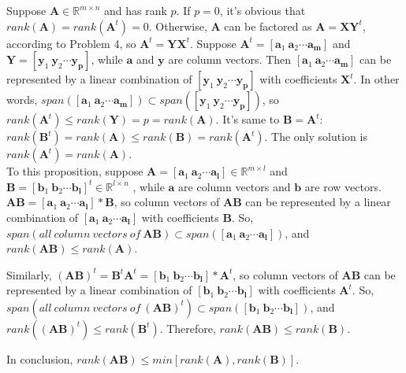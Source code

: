 \documentclass[22pt]{article}
\begin{document}
   		Suppose $\mathbf{A} \in \mathbb{R}^{m\times n}$ and has rank $p$. If $p=0$, it's obvious that $rank(\mathbf{A}) = rank(\mathbf{A}^t) = 0$. Otherwise, $\mathbf{A}$ can be factored as $\mathbf{A} = \mathbf{XY}^t$, according to Problem 4, so $\mathbf{A}^t = \mathbf{YX}^t$. Suppose $\mathbf{A}^t = [\mathbf{a}_1\ \mathbf{a}_2 \cdots \mathbf{a_m}]$ and $\mathbf{Y} = [\mathbf{y}_1\ \mathbf{y}_2 \cdots \mathbf{y_p}]$, while $\mathbf{a}$ and $\mathbf{y}$ are column vectors. Then $ [\mathbf{a}_1\ \mathbf{a}_2 \cdots \mathbf{a_m}]$ can be represented by a linear combination of $[\mathbf{y}_1\ \mathbf{y}_2 \cdots \mathbf{y_p}]$ with coefficients $\mathbf{X}^t$. In other words, $span([\mathbf{a}_1\ \mathbf{a}_2 \cdots \mathbf{a_m}]) \subset span([\mathbf{y}_1\ \mathbf{y}_2 \cdots \mathbf{y_p}])$, so $rank(\mathbf{A}^t) \leq rank(\mathbf{Y}) = p = rank(\mathbf{A})$. It's same to $\mathbf{B} = \mathbf{A}^t$: $rank(\mathbf{B}^t) = rank(\mathbf{A}) \leq rank(\mathbf{B}) = rank(\mathbf{A}^t)$. The only solution is $rank(\mathbf{A}^t) = rank(\mathbf{A})$.\\[1ex]

   		To this proposition, suppose $\mathbf{A} = [\mathbf{a}_1\ \mathbf{a}_2 \cdots \mathbf{a_l}] \in \mathbb{R}^{m\times l}$ and $\mathbf{B} = [\mathbf{b}_1\ \mathbf{b}_2 \cdots \mathbf{b_l}]^t \in \mathbb{R}^{l\times n}$ , while $\mathbf{a}$ are column vectors and $\mathbf{b}$ are row vectors. $\mathbf{AB} = [\mathbf{a}_1\ \mathbf{a}_2 \cdots \mathbf{a_l}]*\mathbf{B}$, so column vectors of $\mathbf{AB}$ can be represented by a linear combination of $[\mathbf{a}_1\ \mathbf{a}_2 \cdots \mathbf{a_l}]$ with coefficients $\mathbf{B}$. So, $span(all\ column\ vectors\ of\ \mathbf{AB}) \subset span([\mathbf{a}_1\ \mathbf{a}_2 \cdots \mathbf{a_l}])$, and $rank(\mathbf{AB})\leq rank(\mathbf{A})$.

   		Similarly, $(\mathbf{AB})^t = \mathbf{B}^t\mathbf{A}^t = [\mathbf{b}_1\ \mathbf{b}_2 \cdots \mathbf{b_l}]*\mathbf{A}^t$, so column vectors of $\mathbf{AB}$ can be represented by a linear combination of $[\mathbf{b}_1\ \mathbf{b}_2 \cdots \mathbf{b_l}]$ with coefficients $\mathbf{A}^t$. So, $span(all\ column\ vectors\ of\ (\mathbf{AB})^t) \subset span([\mathbf{b}_1\ \mathbf{b}_2 \cdots \mathbf{b_l}])$, and $rank((\mathbf{AB})^t)\leq rank(\mathbf{B}^t)$. Therefore, $rank(\mathbf{AB})\leq rank(\mathbf{B})$.

   		In conclusion,  $rank(\mathbf{AB})\leq min[rank(\mathbf{A}),rank(\mathbf{B})]$.
\end{document}

